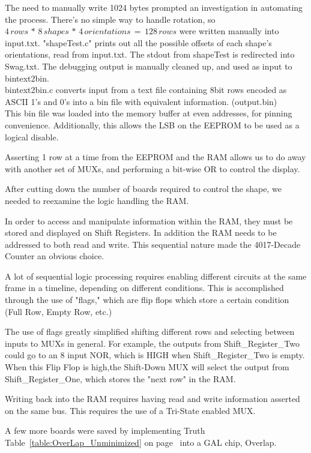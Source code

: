 \documentclass[letterpaper,titlepage,oneside]{article}
\begin{document}
The need to manually write 1024 bytes prompted an investigation in automating the process. There's no simple way to handle rotation, so 
$ 4 \,rows\, *\, 8\, shapes\, *\, 4 \,orientations \,=\, 128\, rows$
were written manually into input.txt. "shapeTest.c" prints out all the possible offsets of each shape's orientations, read from input.txt. The stdout from shapeTest is redirected into Swag.txt. The debugging output is manually cleaned up, and used as input to bintext2bin.\\
bintext2bin.c converts input from a text file containing 8bit rows encoded as ASCII 1's and 0's into a bin file with equivalent information. (output.bin)\\
This bin file was loaded into the memory buffer at even addresses, for pinning convenience. Additionally, this allows the LSB on the EEPROM to be used as a logical disable.

Asserting 1 row at a time from the EEPROM and the RAM allows us to do away with another set of MUXs, and performing a bit-wise OR to control the display.

After cutting down the number of boards required to control the shape, we needed to reexamine the logic handling the RAM.

In order to access and manipulate information within the RAM, they must be stored and displayed on Shift Registers. In addition the RAM needs to be addressed to both read and write. This sequential nature made the 4017-Decade Counter an obvious choice.

A lot of sequential logic processing requires enabling different circuits at the same frame in a timeline, depending on different conditions. This is accomplished through the use of "flags," which are flip flops which store a certain condition (Full Row, Empty Row, etc.)

The use of flags greatly simplified shifting different rows and selecting between inputs to MUXs in general. For example, the outputs from Shift\_Register\_Two could go to an 8 input NOR, which is HIGH when Shift\_Register\_Two is empty. When this Flip Flop is high,the Shift-Down MUX will select the output from Shift\_Register\_One, which stores the "next row" in the RAM. 

Writing back into the RAM requires having read and write information asserted on the same bus. This requires the use of a Tri-State enabled MUX.

A few more boards were saved by implementing Truth Table~\ref{table:OverLap_Unminimized} on page~\pageref{table:OverLap_Unminimized}
 into a GAL chip, Overlap.
 
\end{document}
